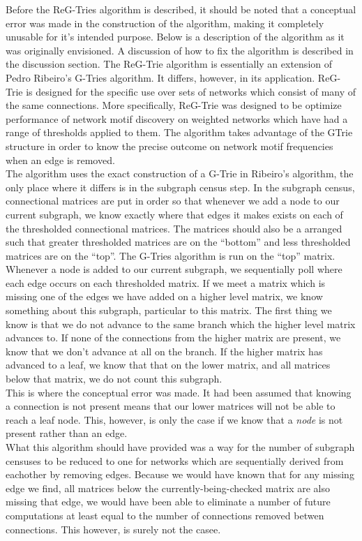 Before the ReG-Tries algorithm is described, it should be noted that a conceptual error was made in the construction of the algorithm, making it completely unusable for it's intended purpose. Below is a description of the algorithm as it was originally envisioned. A discussion of how to fix the algorithm is described in the discussion section. 
The ReG-Trie algorithm is essentially an extension of Pedro Ribeiro's G-Tries algorithm. It differs, however, in its application. ReG-Trie is designed for the specific use over sets of networks which consist of many of the same connections. More specifically, ReG-Trie was designed to be optimize performance of network motif discovery on weighted networks which have had a range of thresholds applied to them. The algorithm takes advantage of the GTrie structure in order to know the precise outcome on network motif frequencies when an edge is removed.\\
The algorithm uses the exact construction of a G-Trie in Ribeiro's algorithm, the only place where it differs is in the subgraph census step. In the subgraph census, connectional matrices are put in order so that whenever we add a node to our current subgraph, we know exactly where that edges it makes exists on each of the thresholded connectional matrices. The matrices should also be a arranged such that greater thresholded matrices are on the ``bottom'' and less thresholded matrices are on the ``top''. The G-Tries algorithm is run on the ``top'' matrix. Whenever a node is added to our current subgraph, we sequentially poll where each edge occurs on each thresholded matrix. If we meet a matrix which is missing one of the edges we have added on a higher level matrix, we know something about this subgraph, particular to this matrix. The first thing we know is that we do not advance to the same branch which the higher level matrix advances to. If none of the connections from the higher matrix are present, we know that we don't advance at all on the branch. If the higher matrix has advanced to a leaf, we know that that on the lower matrix, and all matrices below that matrix, we do not count this subgraph.\\ 
This is where the conceptual error was made. It had been assumed that knowing a connection is not present means that our lower matrices will not be able to reach a leaf node. This, however, is only the case if we know that a \textit{node} is not present rather than an edge.\\
What this algorithm should have provided was a way for the number of subgraph censuses to be reduced to one for networks which are sequentially derived from eachother by removing edges. Because we would have known that for any missing edge we find, all matrices below the currently-being-checked matrix are also missing that edge, we would have been able to eliminate a number of future computations at least equal to the number of connections removed betwen connections. This however, is surely not the casee. 

